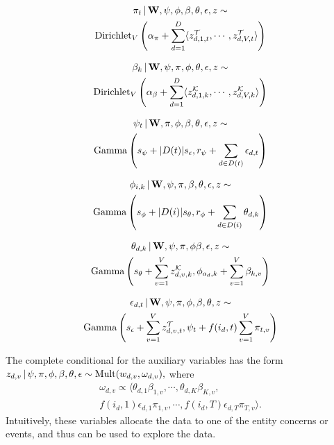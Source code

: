 \begin{multline}
\pi_t \, | \, \mathbf{W}, \psi, \phi, \beta, \theta, \epsilon, z \sim \\
	\mbox{Dirichlet}_V\left(\alpha_\pi + \sum_{d=1}^D \langle
		z^\mathcal{T}_{d,1,t}, \cdots, z^\mathcal{T}_{d,V,t}\rangle
	\right)
\label{eq:pi}
\end{multline}

\begin{multline}
\beta_k \, | \, \mathbf{W}, \psi, \pi, \phi, \theta, \epsilon, z \sim \\
	\mbox{Dirichlet}_V\left(\alpha_\beta + \sum_{d=1}^D \langle
		z^\mathcal{K}_{d,1,k}, \cdots, z^\mathcal{K}_{d,V,k}\rangle
	\right)
\label{eq:beta}
\end{multline}

\begin{multline}
\psi_t \, | \, \mathbf{W}, \pi, \phi, \beta, \theta, \epsilon, z \sim \\
	\mbox{Gamma}\left(
		s_\psi + |D(t)| s_\epsilon,
		r_\psi + \sum_{d\in D(t)} \epsilon_{d,t}
	\right)
\label{eq:psi}
\end{multline}

\begin{multline}
\phi_{i,k} \, | \, \mathbf{W}, \psi, \pi, \beta, \theta, \epsilon, z \sim \\
	\mbox{Gamma}\left(
		s_\phi + |D(i)| s_\theta,
		r_\phi + \sum_{d\in D(i)} \theta_{d,k}
	\right)
\label{eq:phi}
\end{multline}

\begin{multline}
\theta_{d,k} \, | \, \mathbf{W}, \psi, \pi, \phi \beta, \epsilon, z \sim \\
	\mbox{Gamma}\left(
		s_\theta + \sum_{v=1}^V z^\mathcal{K}_{d,v,k},
		\phi_{a_d,k} + \sum_{v=1}^V \beta_{k,v}
	\right)
\label{eq:theta}
\end{multline}

\begin{multline}
\epsilon_{d,t} \, | \, \mathbf{W}, \psi, \pi, \phi, \beta, \theta, z \sim \\
	\mbox{Gamma}\left(
		s_\epsilon + \sum_{v=1}^V z^\mathcal{T}_{d,v,t},
		\psi_t + f(i_d, t) \sum_{v=1}^V \pi_{t,v}
	\right)
\label{eq:epsilon}
\end{multline}

The complete conditional for the auxiliary variables has the form
$z_{d,v} \, | \, \psi, \pi, \phi, \beta, \theta, \epsilon \sim \mbox{Mult}(w_{d,v}, \omega_{d,v}),$ where
\begin{multline}
\omega_{d,v} \propto \langle 
\theta_{d,1} \beta_{1,v}, \cdots, \theta_{d,K} \beta_{K,v}, \\
f(i_d, 1) \epsilon_{d,1} \pi_{1,v}, \cdots, f(i_d, T) \epsilon_{d,T} \pi_{T,v}\rangle.
\label{eq:omega}
\end{multline}
Intuitively, these variables allocate the data to one of the entity concerns or events, and thus can be used to explore the data.

